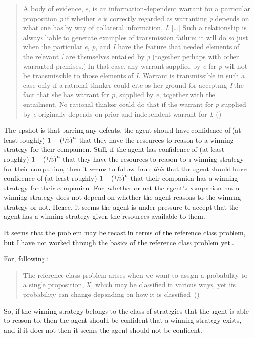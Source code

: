 \documentclass[10pt]{article}
\begin{document}
\begin{quote}
  A body of evidence, \emph{e}, is an information-dependent warrant for a particular proposition \emph{p} if whether \emph{e} is correctly regarded as warranting \emph{p} depends on what one has by way of collateral information, \emph{I}.
  [\dots]
  Such a relationship is always liable to generate examples of transmission failure: it will do so just when the particular \emph{e}, \emph{p}, and \emph{I} have the feature that needed elements of the relevant \emph{I} are themselves entailed by \emph{p} (together perhaps with other warranted premises.)
  In that case, any warrant supplied by \emph{e} for \emph{p} will not be transmissible to those elements of \emph{I}.
  Warrant is transmissible in such a case only if a rational thinker could cite as her ground for accepting \emph{I} the fact that she has warrant for \emph{p}, supplied by \emph{e}, together with the entailment.
  No rational thinker could do that if the warrant for \emph{p} supplied by \emph{e} originally depends on prior and independent warrant for \emph{I}.\linebreak
  \mbox{}\hfill\mbox{(\citeyear[59]{Wright:2003aa})}
\end{quote}

The upshot is that barring any defeats, the agent should have confidence of (at least roughly) \(1 - \left(\sfrac{1}{3}\right)^{n}\) that they have the resources to reason to a winning strategy for their companion.
Still, if the agent has confidence of (at least roughly) \(1 - \left(\sfrac{1}{3}\right)^{n}\) that they have the resources to reason to a winning strategy for their companion, then it seems to follow from \emph{this} that the agent should have confidence of (at least roughly) \(1 - \left(\sfrac{1}{3}\right)^{n}\) that their companion has a winning strategy for their companion.
For, whether or not the agent's companion has a winning strategy does not depend on whether the agent reasons to the winning strategy or not.
Hence, it seems the agent is under pressure to accept that the agent has a winning strategy given the resources available to them.

\begin{note}
  It seems that the problem may be recast in terms of the reference class problem, but I have not worked through the basics of the reference class problem yet\dots

  For, following \textcite{Hajek:2007aa}:
  \begin{quote}
    The reference class problem arises when we want to assign a probability to a single proposition, \emph{X}, which may be classified in various ways, yet its probability can change depending on how it is classified.\nolinebreak
    \mbox{}\hfill\mbox{(\citeyear[565]{Hajek:2007aa})}
  \end{quote}
  So, if the winning strategy belongs to the class of strategies that the agent is able to reason to, then the agent should be confident that a winning strategy exists, and if it does not then it seems the agent should not be confident.
\end{note}
\end{document}
